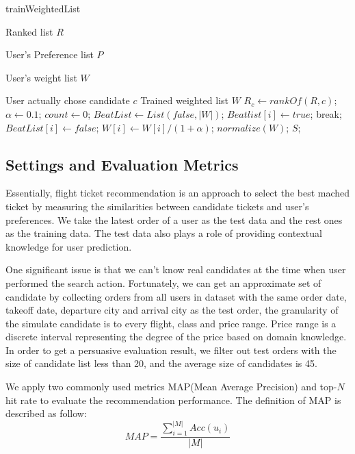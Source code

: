 \documentclass{sig-alternate-05-2015}
\begin{document}
\begin{algorithm}[htb]
\caption{trainWeightedList}
\label{alg4}
\begin{algorithmic}[1]
\REQUIRE \par
Ranked list $R$ \par
User's Preference list $P$ \par
User's weight list $W$ \par
User actually chose candidate $c$
\ENSURE Trained weighted list $W$
\STATE $R_c \leftarrow rankOf(R,c)$;
\STATE $\alpha \leftarrow 0.1$;
\STATE $count \leftarrow 0$;
\STATE $BeatList \leftarrow List(false,|W|)$;
\STATE $Beatlist[i] \leftarrow true$;
\STATE break;
\ENDIF
\ENDFOR
{}
\STATE $BeatList[i] \leftarrow false$;
\STATE $W[i] \leftarrow W[i] / (1+\alpha)$;
\ENDIF
\ENDFOR
\ENDWHILE
\STATE $normalize(W)$;
\RETURN $S$;
\end{algorithmic} 
\end{algorithm}


\subsection{Settings and Evaluation Metrics}
Essentially, flight ticket recommendation is an approach to select the best mached ticket by measuring the similarities between candidate tickets and user's preferences. We take the latest order of a user as the test data and the rest ones as the training data. The test data also plays a role of providing contextual knowledge for user prediction.\par
One significant issue is that we can't know real candidates at the time when user performed the search action. Fortunately, we can get an approximate set of candidate by collecting orders from all users in dataset with the same order date, takeoff date, departure city and arrival city as the test order, the granularity of the simulate candidate is to every flight, class and price range. Price range is a discrete interval representing the degree of the price based on domain knowledge. In order to get a persuasive evaluation result, we filter out test orders with the size of candidate list less than 20, and the average size of candidates is 45.\par
We apply two commonly used metrics MAP(Mean Average Precision) and top-$N$ hit rate to evaluate the recommendation performance. The definition of MAP is described as follow:\\
\begin{equation}
MAP = \frac{\sum_{i=1}^{|M|}Acc(u_i)}{|M|}
\end{equation}
\end{document}
